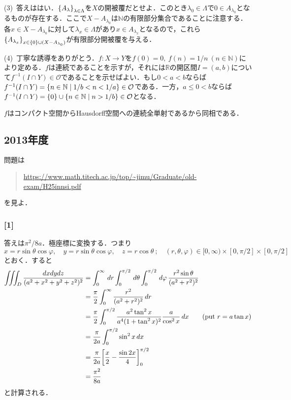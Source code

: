 \documentclass[a4j]{ltjsarticle}
\newcommand{\Rset}{\mathbb{R}}
\newcommand{\Nset}{\mathbb{N}}
\newcommand{\1}{\mathbbm{1}}
\numberwithin{equation}{section}
\theoremstyle{definition}
\begin{document}
(3)\ 答えははい．$\qty{A_\lambda}_{\lambda\in\Lambda}$を$X$の開被覆だとせよ．このとき$\lambda_0\in\Lambda$で$0\in A_{\lambda_0}$となるものが存在する．ここで$X-A_{\lambda_0}$は$\Nset$の有限部分集合であることに注意する．各$x\in X-A_{\lambda_0}$に対して$\lambda_x\in\Lambda$があり$x\in A_{\lambda_x}$となるので，これら$\qty{A_{\lambda_x}}_{x\in \qty{0}\cup (X-A_{\lambda_0})}$が有限部分開被覆を与える．

(4)\ 丁寧な誘導をありがとう．$f\colon X\to Y$を$f(0)=0,\ f(n)=1/n\ (n\in\Nset)$により定める．$f$は連続であることを示すが，それには$\Rset$の開区間$I=(a,b)$について$f^{-1}(I\cap Y)\in\mathcal{O}$であることを示せばよい．もし$0<a<b$ならば$f^{-1}(I\cap Y)=\qty{n\in\Nset \mid 1/b<n<1/a}\in\mathcal{O}$である．一方，$a\leq 0<b$ならば$f^{-1}(I\cap Y)=\qty{0}\cup \qty{n\in\Nset\mid n>1/b}\in\mathcal{O}$となる．

$f$はコンパクト空間からHausdorff空間への連続全単射であるから同相である．
\subsection{2013年度}
問題は
\begin{quote}
    \url{https://www.math.titech.ac.jp/top/~jimu/Graduate/old-exam/H25innsi.pdf}
\end{quote}
を見よ．
\subsubsection*{[1]}答えは$\pi^2/8a$．極座標に変換する．つまり
\begin{equation}
    x=r\sin\theta\cos\varphi,\quad y=r\sin\theta\cos\varphi,\quad z=r\cos\theta\ ;\quad (r,\theta,\varphi)\in [0,\infty)\times [0,\pi/2]\times [0,\pi/2]
\end{equation}
とおく．すると
\begin{align}
    \iiint_{D}\frac{dxdydz}{(a^2+x^2+y^2+z^2)^2}&=\int_0^\infty\,dr \int_0^{\pi/2}\,d\theta\int_0^{\pi/2}\,d\varphi\,\frac{r^2\sin\theta}{(a^2+r^2)^2}\\
    &=\frac{\pi}{2}\int_{0}^\infty\frac{r^2}{(a^2+r^2)^2}\,dr\\
    &=\frac{\pi}{2}\int_{0}^{\pi/2}\frac{a^2\tan^2 x}{a^4(1+\tan^2x)^2}\frac{a}{\cos^2 x}\,dx\qquad(\text{put $r=a\tan x$})\\
    &=\frac{\pi}{2a}\int_{0}^{\pi/2}\sin^2 x\,dx\\
    &=\frac{\pi}{2a}\qty[\frac{x}{2}-\frac{\sin 2x}{4}]_0^{\pi/2}\\
    &=\frac{\pi^2}{8a}
\end{align}
と計算される．
\end{document}
